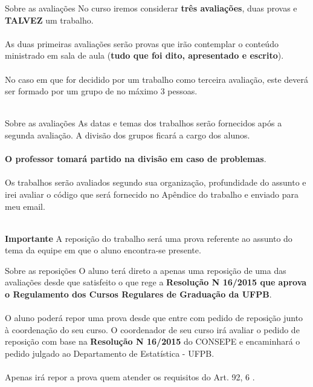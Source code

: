 \documentclass{beamer}
\begin{document}
\begin{frame}{Sobre as avaliações}
No curso iremos considerar \textbf{três avaliações}, duas provas e \textbf{TALVEZ} um trabalho.\\~\\

As duas primeiras avaliações serão provas que irão contemplar o conteúdo ministrado em sala de aula (\textbf{tudo que foi dito, apresentado e escrito}).\\~\\

No caso em que for decidido por um trabalho como terceira avaliação, este deverá ser formado por um grupo de no máximo 3 pessoas.\\~\\
\end{frame}

\begin{frame}{Sobre as avaliações}
As datas e temas dos trabalhos serão fornecidos após a segunda avaliação. A divisão dos grupos ficará a cargo dos alunos. \\~\\

\textbf{O professor tomará partido na divisão em caso de problemas}.\\~\\

Os trabalhos serão avaliados segundo sua organização, profundidade do assunto e irei avaliar o código que será fornecido no Apêndice do trabalho e enviado para meu email. \\~\\

\begin{block}{\textbf{Importante}}
A reposição do trabalho será uma prova referente ao assunto do tema da equipe em que o aluno encontra-se presente.
\end{block}
\end{frame}

\begin{frame}{Sobre as reposições}
O aluno terá direto a apenas uma reposição de uma das avaliações desde que satisfeito o que rege a \textbf{Resolução  N\textsuperscript{\textordmasculine} 16/2015 que aprova o Regulamento dos Cursos Regulares de Graduação da UFPB}.\\~\\

O aluno poderá repor uma prova desde que entre com pedido de reposição junto à coordenação do seu curso. O coordenador de seu curso irá avaliar o pedido de reposição com base na \textbf{Resolução N\textsuperscript{\textordmasculine}  16/2015} do CONSEPE e encaminhará o pedido julgado ao Departamento de Estatística - UFPB.\\~\\

Apenas irá repor a prova quem atender os requisitos do Art. 92, 6\textsuperscript{\textordmasculine} \textsection. 
\end{frame}
\end{document}
